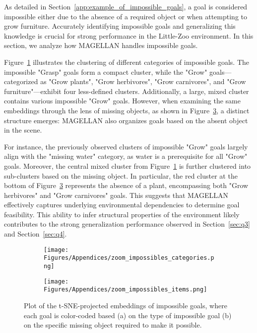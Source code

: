 As detailed in Section~\ref{app:example_of_impossible_goals}, a goal is considered impossible either due to the absence of a required object or when attempting to grow furniture. Accurately identifying impossible goals and generalizing this knowledge is crucial for strong performance in the Little-Zoo environment. In this section, we analyze how MAGELLAN handles impossible goals.

Figure~\ref{fig:zoom_impossibles_categories} illustrates the clustering of different categories of impossible goals. The impossible "Grasp" goals form a compact cluster, while the "Grow" goals—categorized as "Grow plants", "Grow herbivores", "Grow carnivores", and "Grow furniture"—exhibit four less-defined clusters. Additionally, a large, mixed cluster contains various impossible "Grow" goals. However, when examining the same embeddings through the lens of missing objects, as shown in Figure~\ref{fig:zoom_impossibles_items}, a distinct structure emerges: MAGELLAN also organizes goals based on the absent object in the scene.

For instance, the previously observed clusters of impossible "Grow" goals largely align with the "missing water" category, as water is a prerequisite for all "Grow" goals. Moreover, the central mixed cluster from Figure~\ref{fig:zoom_impossibles_categories} is further clustered into sub-clusters based on the missing object. In particular, the red cluster at the bottom of Figure~\ref{fig:zoom_impossibles_items} represents the absence of a plant, encompassing both "Grow herbivores" and "Grow carnivores" goals. This suggests that MAGELLAN effectively captures underlying environmental dependencies to determine goal feasibility. This ability to infer structural properties of the environment likely contributes to the strong generalization performance observed in Section~\ref{sec:q3} and Section~\ref{sec:q4}.

\begin{figure}[H]
    \centering
    \begin{subfigure}[t]{\linewidth}
        \centering
        \texttt{[image: Figures/Appendices/zoom\_impossibles\_categories.png]}
        \caption{}
        \label{fig:zoom_impossibles_categories}
    \end{subfigure}
    \begin{subfigure}[t]{\linewidth}
        \centering
        \texttt{[image: Figures/Appendices/zoom\_impossibles\_items.png]}
        \caption{}
        \label{}
    \end{subfigure}
    \caption{Plot of the t-SNE-projected embeddings of impossible goals, where each goal is color-coded based (a) on the type of impossible goal (b) on the specific missing object required to make it possible.}
    \label{fig:zoom_impossibles_items}
\end{figure}

